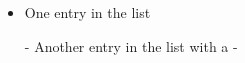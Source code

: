 \documentclass[a4paper]{article}
\begin{document}

\begin{itemize}
	\item One entry in the list
	\item[-] Another entry in the list with a -
\end{itemize}
\end{document}
